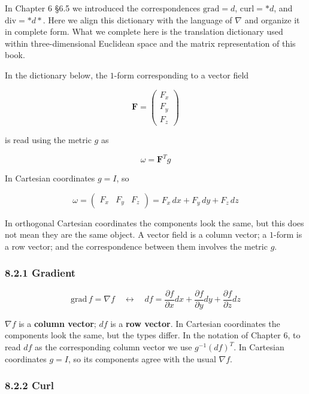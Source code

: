 In Chapter 6 §6.5 we introduced the correspondences \(\mathrm{grad}=d\),
\(\mathrm{curl}=\ast d\), and \(\mathrm{div}=\ast d\ast\). Here we align
this dictionary with the language of \(\nabla\) and organize it in
complete form. What we complete here is the translation dictionary used
within three-dimensional Euclidean space and the matrix representation
of this book.

In the dictionary below, the \(1\)-form corresponding to a vector field

\[
\mathbf{F}
=
\begin{pmatrix}
F_x\\
F_y\\
F_z
\end{pmatrix}
\]

is read using the metric \(g\) as

\[
\omega=\mathbf{F}^T g
\]

In Cartesian coordinates \(g=I\), so

\[
\omega
=
\begin{pmatrix}
F_x & F_y & F_z
\end{pmatrix}
=
F_x\,dx+F_y\,dy+F_z\,dz
\]

In orthogonal Cartesian coordinates the components look the same, but
this does not mean they are the same object. A vector field is a column
vector; a \(1\)-form is a row vector; and the correspondence between
them involves the metric \(g\).

\hypertarget{gradient-1}{%
\subsubsection{8.2.1 Gradient}\label{gradient-1}}

\[
\mathrm{grad}\,f = \nabla f
\quad\longleftrightarrow\quad
df = \frac{\partial f}{\partial x}dx + \frac{\partial f}{\partial y}dy + \frac{\partial f}{\partial z}dz
\]

\(\nabla f\) is a \textbf{column vector}; \(df\) is a
\textbf{row vector}. In Cartesian coordinates the components look the
same, but the types differ. In the notation of Chapter 6, to read \(df\)
as the corresponding column vector we use \(g^{-1}(df)^T\). In Cartesian
coordinates \(g=I\), so its components agree with the usual
\(\nabla f\).

\hypertarget{curl-1}{%
\subsubsection{8.2.2 Curl}\label{curl-1}}

